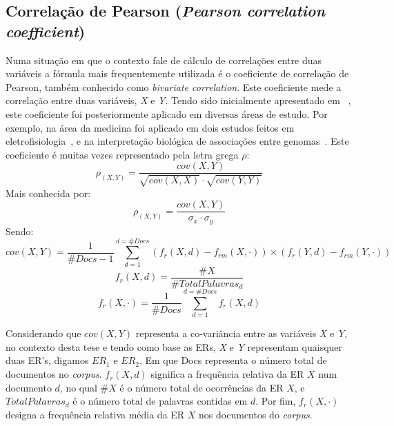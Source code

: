 \subsection{Correlação de Pearson (\textit{Pearson correlation coefficient})}
Numa situação em que o contexto fale de cálculo de correlações entre duas variáveis a fórmula mais frequentemente utilizada é o coeficiente de correlação de Pearson, também conhecido como \textit{bivariate correlation}. Este coeficiente mede a correlação entre duas variáveis, \textit{X} e \textit{Y}. Tendo sido inicialmente apresentado em ~\cite{pearson1896mathematical, pearson1920notes}, este coeficiente foi posteriormente aplicado em diversas áreas de estudo. Por exemplo, na área da medicina foi aplicado em dois estudos feitos em eletrofisiologia~\cite{koerner2017application}, e na interpretação biológica de associações entre genomas~\cite{pers2015biological}.
Este coeficiente é muitas vezes representado pela letra grega $\rho$:
\begin{equation}
\label{equa:correlation_Pearson}
    \rho_{(X,Y)} = \frac{cov(X,Y)}{\sqrt{cov(X,X)}\cdot \sqrt{cov(Y,Y)}}
\end{equation}
Mais conhecida por:
\begin{equation}
    \rho_{(X,Y)} = \frac{cov(X,Y)}{\sigma_{x}\cdot \sigma_{y}}
\end{equation}
Sendo:
\begin{equation}
\label{covarianceXY}
    cov(X,Y) = \frac{1}{\#Docs-1}\sum_{d=1}^{d=\#Docs}(f_{r}(X, d) - f_{rm}(X, \cdot )) \times (f_{r}(Y, d) - f_{rm}(Y, \cdot))
\end{equation}
\begin{equation}
\label{freq_relative}
    f_{r}(X, d) = \frac{\#X}{\#TotalPalavras_{d}}
\end{equation}
\begin{equation}
\label{freq_rela_average}
    f_{r}(X, \cdot) = \frac{1}{\#Docs}\sum_{d=1}^{d=\#Docs}f_{r}(X, d)
\end{equation}

Considerando que $cov(X,Y)$ representa a co-variância entre as variáveis \textit{X} e \textit{Y}, no contexto desta tese e tendo como base as ERs, \textit{X} e \textit{Y} representam quaisquer duas ER's, digamos $ER_{1}$ e $ER_{2}$. Em que Docs representa o número total de documentos no \textit{corpus}. $f_{r}(X, d)$ significa a frequência relativa da ER $X$ num documento $d$, no qual $\#X$ é o número total de ocorrências da ER $X$, e $TotalPalavras_{d}$ é o número total de palavras contidas em $d$. Por fim, $f_{r}(X, \cdot )$ designa a frequência relativa média da ER $X$ nos documentos do \textit{corpus}.

